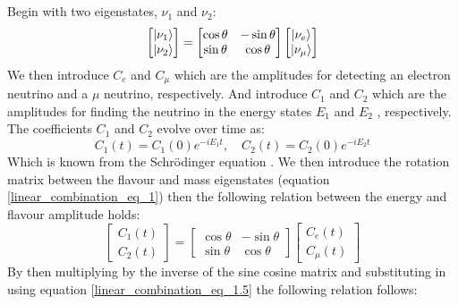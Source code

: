 \\\\Begin with two eigenstates, $\nu_1$ and $\nu_2$: 
\begin{equation}
    \begin{bmatrix}
        \ket{\nu_1} \\
        \ket{\nu_2}
    \end{bmatrix}
    =
    \begin{bmatrix}
        \cos\theta & -\sin\theta \\
        \sin\theta & \cos\theta 
    \end{bmatrix}
        \begin{bmatrix}
        \ket{\nu_e} \\
        \ket{\nu_\mu}
    \end{bmatrix}
    \label{linear_combination_eq_1}
\end{equation}
We then introduce $C_e$ and $C_\mu$ which are the amplitudes for detecting an electron neutrino and a $\mu$ neutrino, respectively. And introduce $C_1$ and $C_2$ which are the amplitudes for finding the neutrino in the energy states $E_1$ and $E_2$ , respectively. The coefficients $C_1$ and $C_2$ evolve over time as:
\begin{equation}
    C_1(t) = C_1(0)e^{-iE_1t}, \quad  C_2(t) = C_2(0)e^{-iE_2t}
    \label{linear_combination_eq_1.5}
\end{equation}
Which is known from the Schrödinger equation \cite{sassaroli1999neutrino} \cite{griffiths2008book}\cite{griffiths2008neutrinoOscillations}. We then introduce the rotation matrix between the flavour and mass eigenstates (equation \ref{linear_combination_eq_1}) then the following relation between the energy and flavour amplitude holds:
\begin{equation}
    \begin{bmatrix}
        C_1(t) \\
        C_2(t)
    \end{bmatrix}
    =
    \begin{bmatrix}
        \cos\theta & -\sin\theta \\
        \sin\theta & \cos\theta 
    \end{bmatrix}
        \begin{bmatrix}
        C_e(t) \\
        C_\mu(t)
    \end{bmatrix}
    \label{linear_combination_eq_2}
\end{equation}
By then multiplying by the inverse of the sine cosine matrix and substituting in using equation \ref{linear_combination_eq_1.5} the following relation follows:

